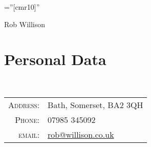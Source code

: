 \documentclass[a4paper,12pt]{article}
\begin{document}

\pagestyle{empty} %

\font\fb=''[cmr10]'' %


\par{\centering
		{\LARGE Rob Willison
	}\bigskip\par}

\vspace{1cm}
\section{Personal Data}
\
\begin{tabular}{rl}
    \textsc{Address:}   & Bath, Somerset, BA2 3QH\\
    \textsc{Phone:}     & 07985 345092\\
    \textsc{email:}     & \href{mailto:rob@willison.co.uk}{rob@willison.co.uk}
\end{tabular}
\vspace{1cm}
\end{document}
